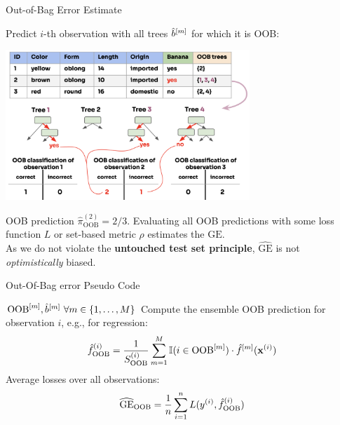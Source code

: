 \documentclass[11pt,compress,t,notes=noshow,xcolor=table]{beamer}
\begin{document}
\begin{vbframe}{Out-of-Bag Error Estimate}

Predict $i$-th observation with all trees $\hat{b}^{[m]}$ for which it is OOB:

\begin{center}
\includegraphics[width=0.69\textwidth]{figure_man/forest-oob-error.png}
\end{center}

OOB prediction $\hat{\pi}^{(2)}_{\text{OOB}} = 2/3$. %
Evaluating all OOB predictions with some loss function $L$ or set-based metric $\rho$ estimates the $\mathrm{GE}$.\\
As we do not violate the \textbf{untouched test set principle}, $\widehat{\mathrm{GE}}$ is not \textit{optimistically} biased.%
\end{vbframe}

\begin{vbframe}{Out-Of-Bag error Pseudo Code}
\begin{algorithm}[H]
  \footnotesize
  \caption*{Out-Of-Bag error estimation}
  \begin{algorithmic}[1]
     $\text{OOB}^{[m]}, \hat{b}^{[m]} \ \forall m \in \{1, \dots, M\}$
      \State Compute the ensemble OOB prediction for observation $i$, e.g., for regression:
      $$\hat{f}^{(i)}_{\text{OOB}} =
      \frac{1}{S_{\text{OOB}}^{(i)}} \sum_{m = 1}^{M}
      \mathbb{I}(i \in \text{OOB}^{[m]}) \cdot \hat{f}^{[m]}(\mathbf{x}^{(i)}) $$
    \EndFor
    \State Average losses over all observations: $$\widehat{\mathrm{GE}}_{\text{OOB}} = \frac{1}{n} \sum\limits_{i=1}^n L(y^{(i)}, \hat{f}^{(i)}_{\text{OOB}})$$

  \end{algorithmic}
\end{algorithm}
\end{vbframe}
\end{document}
